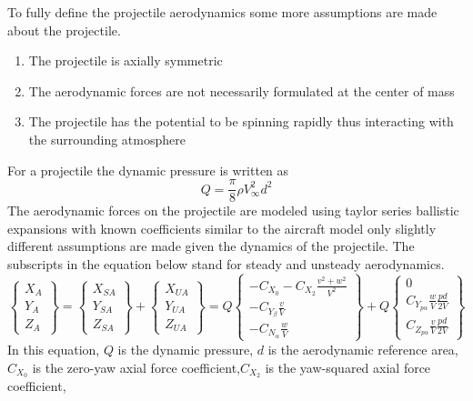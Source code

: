 To fully define the projectile aerodynamics some more assumptions are
made about the projectile.
\begin{enumerate}
\item The projectile is axially symmetric
\item The aerodynamic forces are not necessarily formulated at the center
  of mass
\item The projectile has the potential to be spinning rapidly thus
  interacting with the surrounding atmosphere
\end{enumerate}
For a projectile the dynamic pressure is written as
\begin{equation}\label{e:rocket_q}
Q = \frac{\pi}{8}\rho V_{\infty}^2d^2 
\end{equation}
The aerodynamic forces on the projectile are modeled using taylor series
ballistic expansions with known coefficients similar to the aircraft
model only slightly different assumptions are made given the dynamics
of the projectile. The subscripts in the equation below stand for
steady and unsteady aerodynamics.
\begin{equation}\label{e:aeroF}
\begin{Bmatrix} X_A \\ Y_A\\ Z_A \end{Bmatrix} = \begin{Bmatrix}
  X_{SA} \\ Y_{SA}\\ Z_{SA} \end{Bmatrix} + \begin{Bmatrix}
  X_{UA} \\ Y_{UA}\\ Z_{UA} \end{Bmatrix} = 
Q \begin{Bmatrix} -C_{X_0} - C_{X_2}\frac{v^2+w^2}{V^2}\\
-C_{Y_\beta}\frac{v}{V}\\
-C_{N_\alpha}\frac{w}{V}
\end{Bmatrix} + Q \begin{Bmatrix} 0
  \\ C_{Y_{p\alpha}}\frac{w}{V}\frac{pd}{2V} \\ C_{Z_{p\alpha}}\frac{v}{V}\frac{pd}{2V}\end{Bmatrix}
\end{equation}
In this equation, $Q$ is the dynamic pressure, $d$ is the aerodynamic
reference area, $C_{X_0}$ is the zero-yaw axial force
coefficient,$C_{X_2}$ is the yaw-squared axial force coefficient,

